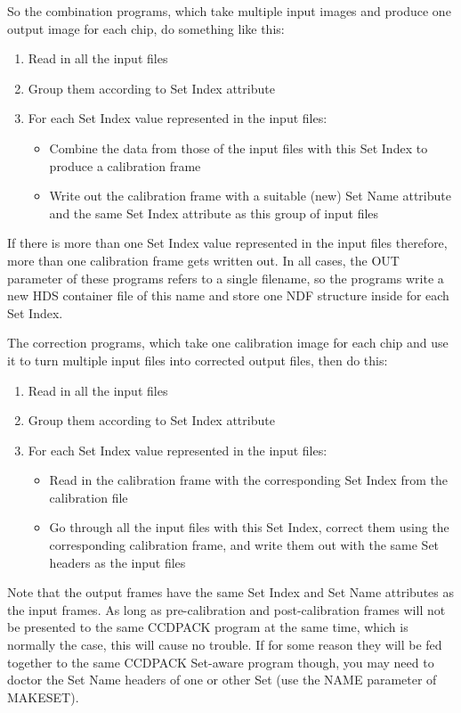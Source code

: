 \documentclass[twoside,11pt]{article}
\newcommand{\htmlref}[2]{#1}
\renewcommand{\_}{\texttt{\symbol{95}}}
\newcommand{\xroutine}[1]{\htmlref{{\sc #1}}{#1}}
\begin{document}
So the combination programs, 
which take multiple input images and produce one output image for each chip,
do something like this:
\begin{enumerate}
\item 
Read in all the input files
\item
Group them according to Set Index attribute
\item
For each Set Index value represented in the input files:
\begin{itemize}
\item Combine the data from those of the input files with this Set Index
      to produce a calibration frame
\item Write out the calibration frame with a suitable (new) Set Name
      attribute and the same Set Index attribute as this group of input files
\end{itemize}
\end{enumerate}
If there is more than one Set Index value represented in the input files
therefore, more than one calibration frame gets written out.
In all cases, the OUT parameter of these programs refers to a single
filename, so the programs write a new HDS container file of this
name and store one NDF structure inside for each Set Index.

The correction programs, 
which take one calibration image for each chip and use it to turn multiple
input files into corrected output files,
then do this:
\begin{enumerate}
\item
Read in all the input files
\item
Group them according to Set Index attribute
\item
For each Set Index value represented in the input files:
\begin{itemize}
\item Read in the calibration frame with the corresponding Set Index
      from the calibration file
\item Go through all the input files with this Set Index, correct them
      using the corresponding calibration frame, and write them out with
      the same Set headers as the input files
\end{itemize}
\end{enumerate}
Note that the output frames have the same Set Index and Set Name
attributes as the input frames.
As long as pre-calibration and post-calibration frames will not
be presented to the same CCDPACK program at the same time,
which is normally the case, this will cause no trouble.
If for some reason they will be fed together to the same 
CCDPACK Set-aware program though, you may need to doctor the Set Name
headers of one or other Set (use the NAME parameter of \xroutine{MAKESET}).
\end{document}
